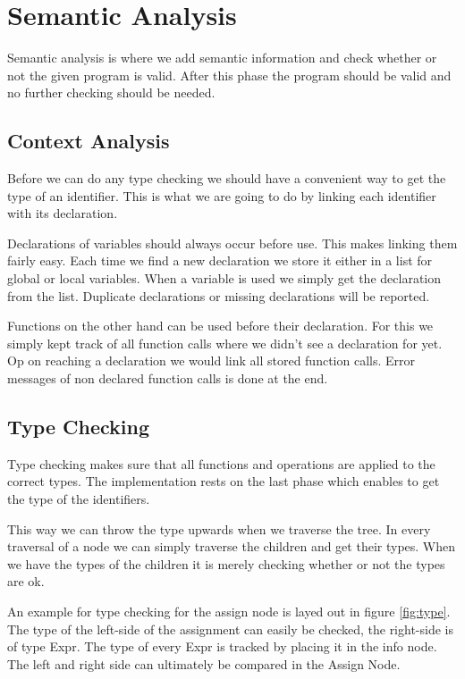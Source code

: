 \documentclass[a4paper]{article}
\begin{document}
\section{Semantic Analysis}
Semantic analysis is where we add semantic information and check whether or not
the given program is valid. After this phase the program should be valid and no
further checking should be needed.

\subsection{Context Analysis}
Before we can do any type checking we should have a convenient way to get the
type of an identifier. This is what we are going to do by linking each
identifier with its declaration.

Declarations of variables should always occur before use. This makes linking
them fairly easy. Each time we find a new declaration we store it either in a list
for global or local variables. When a variable is used we simply get the
declaration from the list. Duplicate declarations or missing declarations will
be reported.

Functions on the other hand can be used before their declaration. For this we
simply kept track of all function calls where we didn't see a declaration for
yet. Op on reaching a declaration we would link all stored function calls. Error
messages of non declared function calls is done at the end.

\subsection{Type Checking}
Type checking makes sure that all functions and operations are applied to the
correct types. The implementation rests on the last phase which enables to get
the type of the identifiers.

This way we can throw the type upwards when we traverse the tree. In every
traversal of a node we can simply traverse the children and get their types.
When we have the types of the children it is merely checking whether or not the
types are ok.

An example for type checking for the assign node
is layed out in figure \ref{fig:type}. The type of the left-side of the
assignment can easily be checked, the right-side is of type Expr. The type of
every Expr is tracked by placing it in the info node. The left and right side
can ultimately be compared in the Assign Node.
\end{document}

